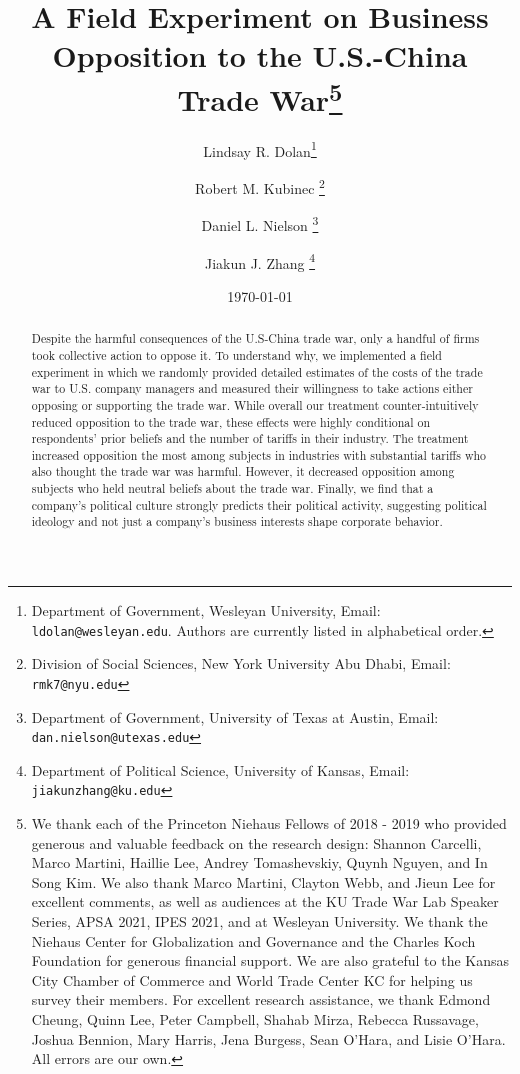 \documentclass{article}
\title{A Field Experiment on Business Opposition to the U.S.-China Trade War\thanks{We thank each of the Princeton Niehaus Fellows of 2018 -  2019 who provided generous and valuable feedback on the research design: Shannon Carcelli, Marco Martini, Haillie Lee, Andrey Tomashevskiy, Quynh Nguyen, and In Song Kim. We also thank Marco Martini, Clayton Webb, and Jieun Lee for excellent comments, as well as audiences at the KU Trade War Lab Speaker Series, APSA 2021, IPES 2021, and at Wesleyan University. We thank the Niehaus Center for Globalization and Governance and the Charles Koch Foundation for generous financial support. We are also grateful to the Kansas City Chamber of Commerce and World Trade Center KC for helping us survey their members. For excellent research assistance, we thank Edmond Cheung, Quinn Lee, Peter Campbell, Shahab Mirza, Rebecca Russavage, Joshua Bennion, Mary Harris, Jena Burgess, Sean O'Hara, and Lisie O'Hara. All errors are our own.}}
\author{
 Lindsay R. Dolan\thanks{
 Department of Government,
  Wesleyan University, Email:
  \texttt{ldolan@wesleyan.edu}. Authors are currently listed in alphabetical order.}
  \and
  Robert M. Kubinec \thanks{
  Division of Social Sciences,
  New York University Abu Dhabi, Email:
  \texttt{rmk7@nyu.edu}}
  \and
  Daniel L. Nielson \thanks{
  Department of Government,
  University of Texas at Austin, Email:
  \texttt{dan.nielson@utexas.edu}}
  \and
  Jiakun J. Zhang \thanks{
  Department of Political Science,
  University of Kansas, Email:
  \texttt{jiakunzhang@ku.edu}
  }
}
\date{\today}
\begin{document}
\maketitle


\begin{abstract}
\noindent


\noindent Despite the harmful consequences of the U.S-China trade war, only a handful of firms took collective action to oppose it. To understand why, we implemented a field experiment in which we randomly provided detailed estimates of the costs of the trade war to U.S. company managers and measured their willingness to take actions either opposing or supporting the trade war. While overall our treatment counter-intuitively reduced opposition to the trade war, these effects were highly conditional on respondents' prior beliefs and the number of tariffs in their industry. The treatment increased opposition the most among subjects in industries with substantial tariffs who also thought the trade war was harmful. However, it decreased opposition among subjects who held neutral beliefs about the trade war. Finally, we find that a company’s political culture strongly predicts their political activity, suggesting political ideology and not just a company’s business interests shape corporate behavior.


\end{abstract}
\end{document}
